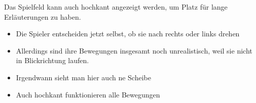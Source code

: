 \documentclass[preview]{standalone}
\begin{document}
\begin{center}
Das Spielfeld kann auch hochkant angezeigt werden, um Platz für lange Erläuterungen zu haben.
        \begin{itemize}
         \item Die Spieler entscheiden jetzt selbst, ob sie nach rechts oder links drehen
         \item Allerdings sind ihre Bewegungen insgesamt noch unrealistisch, weil sie nicht in Blickrichtung laufen.
         \item Irgendwann sieht man hier auch ne Scheibe
         \item Auch hochkant funktionieren alle Bewegungen
        \end{itemize}
\end{center}
\end{document}
